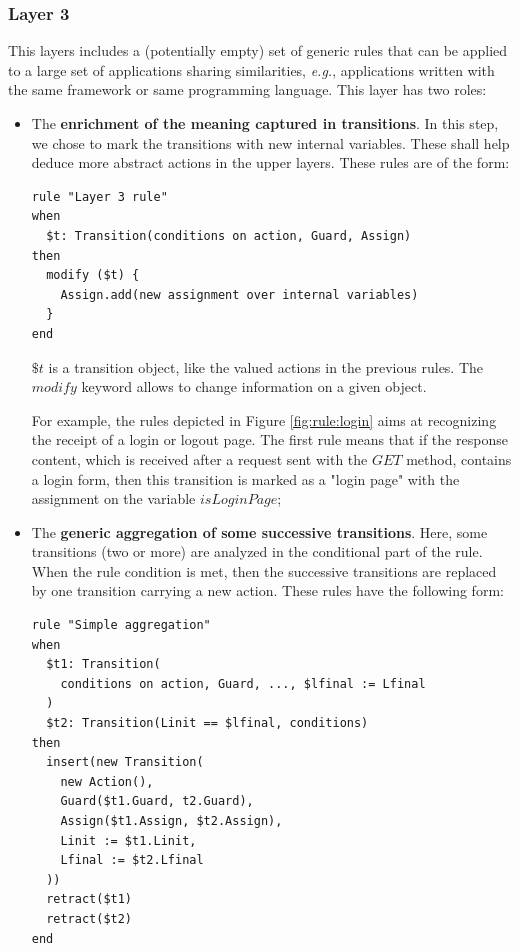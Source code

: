 \subsubsection{Layer 3}

This layers includes a (potentially empty) set of generic rules
that can be applied to a large set of applications sharing
similarities, \emph{e.g.}, applications written with the same framework
or same programming language.  This layer has two roles:

\begin{itemize}
\item The \textbf{enrichment of the meaning captured in
    transitions}. In this step, we chose to mark the transitions
    with new internal variables. These shall help deduce more
    abstract actions in the upper layers. These rules are of the
    form:

\begin{BVerbatim}
rule "Layer 3 rule"
when
  $t: Transition(conditions on action, Guard, Assign)
then
  modify ($t) {
    Assign.add(new assignment over internal variables)
  }
end
\end{BVerbatim}

$\$t$ is a transition object, like the valued actions in the
previous rules. The $modify$ keyword allows to change information
on a given object.

For example, the rules depicted in Figure \ref{fig:rule:login}
aims at recognizing the receipt of a login or logout page. The
first rule means that if the response content, which is received
after a request sent with the $GET$ method, contains a login
form, then this transition is marked as a "login page" with the
assignment on the variable $isLoginPage$;

\item The \textbf{generic aggregation of some successive
    transitions}. Here, some transitions (two or more) are
    analyzed in the conditional part of the rule. When the rule
    condition is met, then the successive transitions are replaced
    by one transition carrying a new action. These rules have the
    following form:

\begin{verbatim}
rule "Simple aggregation"
when
  $t1: Transition(
    conditions on action, Guard, ..., $lfinal := Lfinal
  )
  $t2: Transition(Linit == $lfinal, conditions)
then
  insert(new Transition(
    new Action(),
    Guard($t1.Guard, t2.Guard),
    Assign($t1.Assign, $t2.Assign),
    Linit := $t1.Linit,
    Lfinal := $t2.Lfinal
  ))
  retract($t1)
  retract($t2)
end
\end{verbatim}


\end{itemize}
